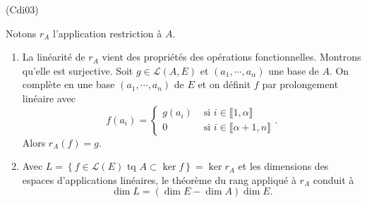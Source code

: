 \begin{tiny}(Cdi03)\end{tiny} Notons $r_A$ l'application \og restriction à $A$\fg.
\begin{enumerate}
  \item La linéarité de $r_A$ vient des propriétés des opérations fonctionnelles. Montrons qu'elle est surjective.\newline
  Soit $g \in \mathcal{L}(A,E)$ et $(a_1,\cdots,a_\alpha)$ une base de $A$. On complète en une base $(a_1,\cdots,a_n)$ de $E$ et on définit $f$ par prolongement linéaire avec
\[
  f(a_i) = 
  \left\lbrace
  \begin{aligned}
    g(a_i) &\text{ si } i\in \llbracket 1, \alpha \rrbracket \\
    0  &\text{ si } i\in \llbracket \alpha +1, n\rrbracket
  \end{aligned}
  \right. .
\]
Alors $r_A(f) = g$.
  \item Avec  $L = \left\lbrace f\in \mathcal{L}(E) \text{ tq } A \subset \ker f\right\rbrace = \ker r_A$ et les dimensions des espaces d'applications linéaires, le théorème du rang appliqué à $r_A$ conduit à
\[
  \dim L = (\dim E - \dim A) \dim E.
\]

\end{enumerate}
